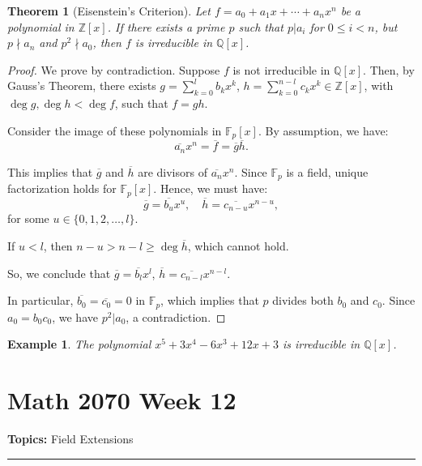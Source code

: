 \documentclass[a4paper,12pt]{report}
\newcommand{\ol}[1]{\overline{#1}}
\newcounter{statement}
\numberwithin{statement}{chapter}
\newtheorem{thm}[statement]{Theorem}
\newtheorem{eg}[statement]{\bf Example}
\numberwithin{equation}{chapter}
\numberwithin{section}{chapter}
\numberwithin{subsection}{section}
\begin{document}
\begin{thm}[Eisenstein's Criterion]


Let $f = a_0 + a_1 x + \cdots + a_n x^n$ be a polynomial in $\mathbb{Z}[x]$.
If there exists a prime $p$ such that $p | a_i$ for $0 \leq i < n$, but $p \nmid a_n$ and
$p^2 \nmid a_0$, then $f$ is irreducible in $\mathbb{Q}[x]$.
\end{thm}
\begin{proof}

We prove by contradiction.  Suppose $f$ is not irreducible in $\mathbb{Q}[x]$.
Then, by Gauss's Theorem, there exists $g = \sum_{k = 0}^l b_kx^k$,
$h = \sum_{k = 0}^{n - l} c_k x^k \in \mathbb{Z}[x]$, with $\deg g, \deg h < \deg f$,
such that $f = gh$.


Consider the image of these polynomials in $\mathbb{F}_p[x]$.
By assumption, we have:
\[
\ol{a_n}x^n = \ol{f} = \ol{g}\ol{h}.
\]

This implies that $\ol{g}$ and $\ol{h}$ are divisors of $\ol{a_n}x^n$.
Since $\mathbb{F}_p$ is a field, unique factorization holds for $\mathbb{F}_p[x]$.
Hence, we must have:
\[
\ol{g} = \ol{b_u}x^u,\quad
\ol{h} = \ol{c_{n - u}}x^{n - u},
\]
for some $u \in \{0, 1, 2,\ldots, l\}$.


If $u < l$, then $n - u > n - l \geq \deg \ol{h}$, which cannot hold.


So, we conclude that $\ol{g} = \ol{b_l}x^l$, $\ol{h} = \ol{c_{n - l}} x^{n - l}$.


In particular, $\ol{b_0} = \ol{c_0} = 0$ in $\mathbb{F}_p$, which implies
that $p$ divides both $b_0$ and $c_0$.  Since $a_0 = b_0c_0$, we have $p^2 | a_0$,
a contradiction.


\end{proof}







\begin{eg}
The polynomial $x^5 + 3x^4 - 6x^3 +12x + 3$ is irreducible in $\mathbb{Q}[x]$.
\end{eg}
\setcounter{chapter}{12}\setcounter{section}{0}
\setcounter{subsection}{0}
\setcounter{statement}{0}

\chapter*{Math 2070 Week 12}
{\bf Topics: }Field Extensions
\hrule
\end{document}
